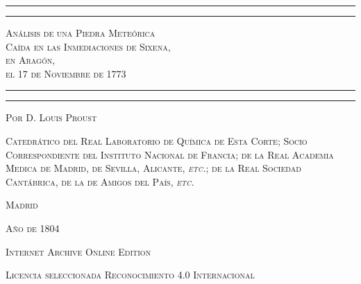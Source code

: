 \documentclass[a4paper, 11pt, oneside, polutonikogreek, spanish]{article}
\begin{document}
\begin{titlepage} %
	\centering %

	
	\rule{\textwidth}{1.6pt}\vspace*{-\baselineskip}\vspace*{2pt} %
	\rule{\textwidth}{0.4pt} %
	
	\vspace{1\baselineskip} %
	
	{\scshape\LARGE Análisis de una Piedra Meteórica \\Caída en las Inmediaciones de Sixena, \\en Aragón, \\el 17 de Noviembre de 1773}
	
	\vspace{1\baselineskip} %

	\rule{\textwidth}{0.4pt}\vspace*{-\baselineskip}\vspace{3.2pt} %
	\rule{\textwidth}{1.6pt} %
	
	\vspace{1\baselineskip} %
	
	
	{\scshape \Large Por D. Louis Proust} %
	
	\vspace*{1\baselineskip} %
	
        {\scshape\normalsize Catedrático del Real Laboratorio de Química de Esta Corte; Socio Correspondiente del Instituto Nacional de Francia; de la Real Academia Medica de Madrid, de Sevilla, Alicante, \emph{etc.}; de la Real Sociedad Cantábrica, de la de Amigos del País, \emph{etc.} } %
    
        \vspace*{\fill}

	\vspace{1\baselineskip}

	{\small\scshape{Madrid}}

	{\small\scshape Año de 1804}
		
	\vspace{0.5\baselineskip} %

        \scshape Internet Archive Online Edition  %
	
	{\scshape\small Licencia seleccionada Reconocimiento 4.0 Internacional} %
\end{titlepage}
\setlength{\parskip}{1mm plus1mm minus1mm}
\clearpage
\end{document}
